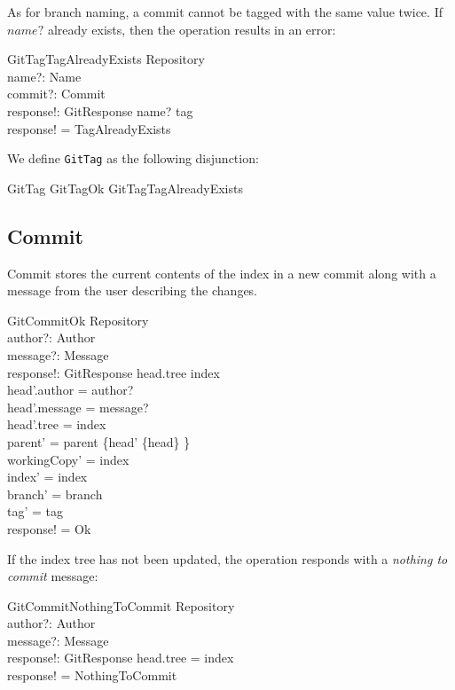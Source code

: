 As for branch naming, a commit cannot be tagged with the same value twice.
If $name?$ already exists, then the operation results in an error:

\begin{schema}{GitTagTagAlreadyExists}
	\Xi Repository \\
	name?: Name \\
	commit?: Commit \\
	response!: GitResponse
\where
	name? \in \dom tag \\
  response! = TagAlreadyExists
\end{schema}

We define \texttt{GitTag} as the following disjunction:

\begin{zed}
	GitTag  GitTagOk \lor GitTagTagAlreadyExists
\end{zed}

\subsection{Commit}

Commit stores the current contents of the index in a new commit along
with a message from the user describing the changes.

\begin{schema}{GitCommitOk}
	\Delta Repository \\
	author?: Author \\
	message?: Message \\
	response!: GitResponse
\where
	head.tree \neq index \\
	head'.author = author? \\
	head'.message = message? \\
	head'.tree = index \\
	parent' = parent \cup \{head' \mapsto \{head\} \} \\
	workingCopy' = index \\
	index' = index \\
	branch' = branch \\
	tag' = tag \\
	response! = Ok
\end{schema}

If the index tree has not been updated, the operation responds
with a \textit{nothing to commit} message:

\begin{schema}{GitCommitNothingToCommit}
	\Xi Repository \\
	author?: Author \\
	message?: Message \\
	response!: GitResponse
\where
	head.tree = index \\
	response! = NothingToCommit
\end{schema}

